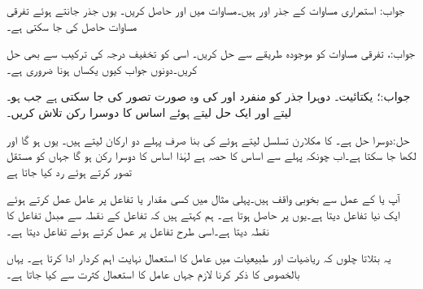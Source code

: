 جواب: 
استمراری مساوات کے جذر  اور  ہیں۔مساوات  میں   اور  حاصل کریں۔ یوں جذر جانتے ہوئے تفرقی مساوات حاصل کی جا سکتی ہے۔

جواب:، 
تفرقی مساوات  کو موجودہ طریقے سے حل کریں۔ اسی کو تخفیف درجہ کی ترکیب سے بھی حل  کریں۔دونوں جواب کیوں یکساں ہونا ضروری ہے۔

جواب:؛ یکتائیت۔ 
دوہرا جذر کو منفرد  اور  کی وہ صورت تصور کی جا سکتی ہے جب  ہو۔ لیتے اور ایک حل  لیتے ہوئے اساس کا دوسرا رکن   تلاش کریں۔

حل:دوسرا حل  ہے۔ کا مکلارن تسلسل لیتے ہوئے  کی بنا صرف پہلے دو ارکان لیتے ہیں۔
یوں   ہو گا اور 
 لکھا جا سکتا ہے۔اب چونکہ  پہلے سے اساس کا حصہ ہے لہٰذا اساس کا دوسرا رکن  ہو گا جہاں  کو مستقل تصور کرتے ہوئے رد کیا جاتا ہے

آپ  یا  کے عمل سے بخوبی واقف ہیں۔پہلی مثال میں کسی مقدار یا تفاعل  پر عامل  عمل کرتے ہوئے ایک نیا تفاعل دیتا ہے۔یوں  پر  حاصل ہوتا ہے۔ ہم کہتے ہیں کہ   تفاعل  کے نقطہ  سے مبدل تفاعل  کا نقطہ  دیتا ہے۔اسی طرح   تفاعل  پر عمل کرتے ہوئے تفاعل  دیتا ہے۔

یہ بتلاتا چلوں کہ ریاضیات اور طبیعیات میں عامل کا استعمال نہایت اہم کردار ادا کرتا ہے۔ یہاں بالخصوص  کا ذکر کرنا لازم جہاں عامل کا استعمال کثرت سے کیا جاتا ہے۔ 

